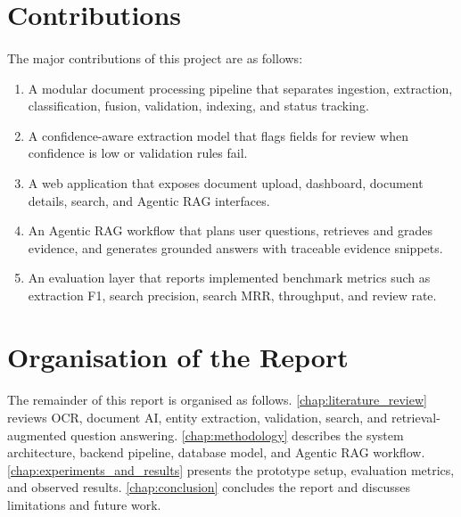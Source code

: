 \section{Contributions}
\paragraph{} The major contributions of this project are as follows:

\begin{enumerate}
    \item A modular document processing pipeline that separates ingestion, extraction, classification, fusion, validation, indexing, and status tracking.
    \item A confidence-aware extraction model that flags fields for review when confidence is low or validation rules fail.
    \item A web application that exposes document upload, dashboard, document details, search, and Agentic RAG interfaces.
    \item An Agentic RAG workflow that plans user questions, retrieves and grades evidence, and generates grounded answers with traceable evidence snippets.
    \item An evaluation layer that reports implemented benchmark metrics such as extraction F1, search precision, search MRR, throughput, and review rate.
\end{enumerate}

\section{Organisation of the Report}
\paragraph{} The remainder of this report is organised as follows. \cref{chap:literature_review} reviews OCR, document AI, entity extraction, validation, search, and retrieval-augmented question answering. \cref{chap:methodology} describes the system architecture, backend pipeline, database model, and Agentic RAG workflow. \cref{chap:experiments_and_results} presents the prototype setup, evaluation metrics, and observed results. \cref{chap:conclusion} concludes the report and discusses limitations and future work.
